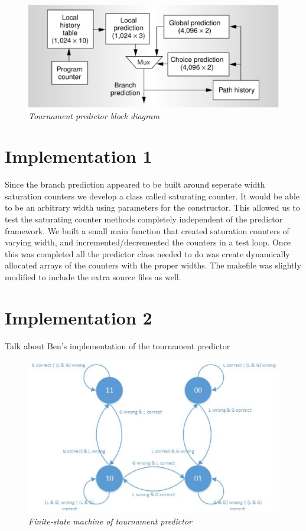 \documentclass[]{report}   %
\begin{document}
\begin{center}
  \begin{figure}[h]
    \label{block-diagram}
    \includegraphics[width=5in]{block_diagram.eps}
    \caption*{\textit{Tournament predictor block diagram\cite{kessler}}}
  \end{figure}
\end{center}
\pagebreak

\section{Implementation 1}
\par{Since the branch prediction appeared to be built around seperate width saturation counters we develop a class called saturating counter.
It would be able to be an arbitrary width using parameters for the constructor.
This allowed us to test the saturating counter methods completely independent of the predictor framework.
We built a small main function that created saturation counters of varying width, and incremented/decremented the counters in a test loop.
Once this was completed all the predictor class needed to do was create dynamically allocated arrays of the counters with the proper widths.
The makefile was slightly modified to include the extra source files as well.}

\section{Implementation 2}
Talk about Ben's implementation of the tournament predictor

\begin{center}
  \begin{figure}[h]
    \label{state-machine}
    \includegraphics[width=5in]{CPT_FSM.eps}
    \caption*{\textit{Finite-state machine of tournament predictor}}
  \end{figure}
\end{center}
\end{document}
